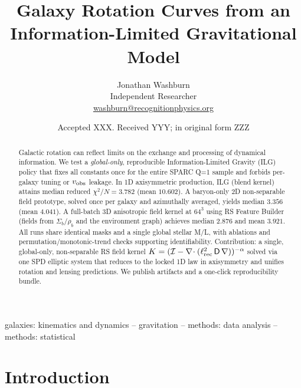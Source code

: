 \documentclass[fleqn,usenatbib]{mnras}
\title{Galaxy Rotation Curves from an Information-Limited Gravitational Model}
\author{Jonathan Washburn\\
Independent Researcher\\
\href{mailto:washburn@recognitionphysics.org}{washburn@recognitionphysics.org}}
\date{Accepted XXX. Received YYY; in original form ZZZ}
\begin{document}
\maketitle

\begin{abstract}
Galactic rotation can reflect limits on the exchange and processing of dynamical information. We test a \emph{global-only}, reproducible Information-Limited Gravity (ILG) policy that fixes all constants once for the entire SPARC Q=1 sample and forbids per-galaxy tuning or $v_{\rm obs}$ leakage. In 1D axisymmetric production, ILG (blend kernel) attains median reduced $\chi^2/N=3.782$ (mean $10.602$). A baryon-only 2D non-separable field prototype, solved once per galaxy and azimuthally averaged, yields median $3.356$ (mean $4.041$). A full-batch 3D anisotropic field kernel at $64^3$ using RS Feature Builder (fields from $\Sigma_b/\rho_b$ and the environment graph) achieves median $2.876$ and mean $3.921$. All runs share identical masks and a single global stellar M/L, with ablations and permutation/monotonic-trend checks supporting identifiability. Contribution: a single, global-only, non-separable RS field kernel $K=(\mathcal I-\nabla\!\cdot(\ell_{\rm rec}^2\,\mathsf D\,\nabla))^{-\alpha}$ solved via one SPD elliptic system that reduces to the locked 1D law in axisymmetry and unifies rotation and lensing predictions. We publish artifacts and a one-click reproducibility bundle.
\end{abstract}

\begin{keywords}
galaxies: kinematics and dynamics -- gravitation -- methods: data analysis -- methods: statistical
\end{keywords}

\section{Introduction}

\noindent{}
\end{document}
